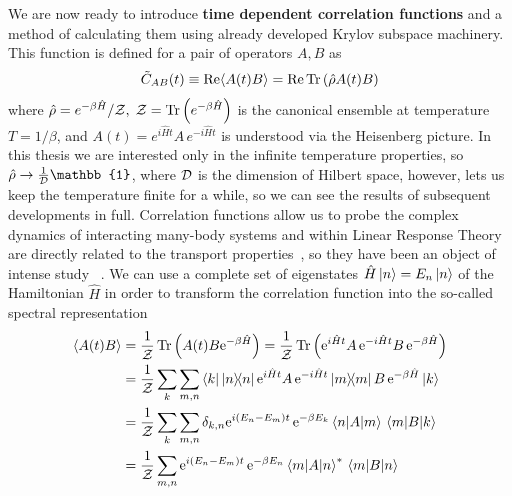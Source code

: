 We are now ready to introduce \textbf{time dependent correlation functions} and a method of calculating them using already
developed Krylov subspace machinery. This function is defined for a pair of operators \(A, B\) as
\begin{equation}
	\tilde{C}_{AB}(t) \equiv \Re \langle A(t) B \rangle = \Re \Tr\left(\hat{\rho}A(t)B\right)
	\label{eq:corr_fun}
\end{equation}
where \(\hat{\rho} = e^{-\beta \hat{H} }/\mathcal{Z},\; \mathcal{Z} = \Tr\left(e^{-\beta \hat{H} }\right)\) is the canonical ensemble at temperature \(T = 1/\beta\),
and \(A(t) = e^{i \hat{H} t} A\, e^{-i \hat{H} t}\) is understood via the Heisenberg picture. In this thesis we are
interested only in the infinite temperature properties, so \(\hat{\rho} \to \frac{1}{\dimension} \mathbb{1}\), where \(\mathcal{D}\) is
the dimension of Hilbert space, however, lets us keep the temperature finite for a while, so we can see the results of subsequent
developments in full. Correlation functions allow us to probe the complex dynamics of interacting many-body
systems and within Linear Response Theory are directly related to the transport properties~\autocite{Mahan2000}, so
they have been an object of intense study
~\autocite{Steinigeweg2014,Sirker2009,Steinigeweg2009,Karrasch2013a,Karrasch2012,Steinigeweg2015,Richter2019}.
We can use a complete set of eigenstates \(\hat{H} \ket{n} = E_n \ket{n}\) of the Hamiltonian \(\hat{H}\) in order to transform
the correlation function into the so-called spectral representation
\begin{align}
	\langle A(t) B \rangle & =  \frac{1}{\mathcal{Z}}\Tr\left(A(t)B \mathrm{e}^{-\beta \hat{H} }\right) = \frac{1}{\mathcal{Z}}\Tr\left(\mathrm{e}^{i \hat{H} t} A\, \mathrm{e}^{-i \hat{H} t}B \,\mathrm{e}^{-\beta \hat{H} }\right)\nonumber              \\
	                       & = \frac{1}{\mathcal{Z}} \sum_k \sum_{m,n} \bra{k} \ketbra{n}{n} \mathrm{e}^{i \hat{H} t} A \,\mathrm{e}^{-i \hat{H} t} \ketbra{m}{m} B \,\mathrm{e}^{-\beta \hat{H} } \ket{k}  \nonumber                       \\
	                       & = \frac{1}{\mathcal{Z}} \sum_k \sum_{m,n} \delta_{k,n} \mathrm{e}^{i (E_n  - E_m) t} \,\mathrm{e}^{-\beta E_k} \matrixel{n}{A}{m} \matrixel{m}{B}{k} \nonumber \\
	                       & = \frac{1}{\mathcal{Z}} \sum_{m,n} \mathrm{e}^{i (E_n  - E_m) t}\, \mathrm{e}^{-\beta E_n}\matrixel{m}{A}{n}^{\ast} \matrixel{m}{B}{n}
\end{align}

